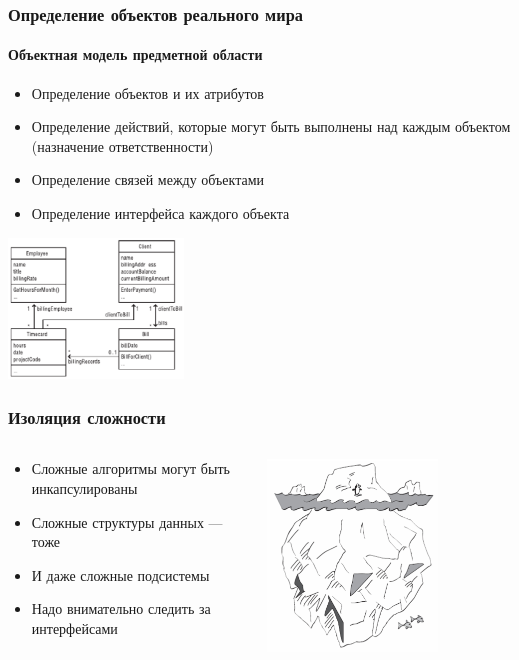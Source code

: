 \documentclass[xetex,mathserif,serif]{beamer}
\begin{document}
	\begin{frame}
		\frametitle{Определение объектов реального мира}
		\framesubtitle{Объектная модель предметной области}
		\begin{itemize}
			\item Определение объектов и их атрибутов
			\item Определение действий, которые могут быть выполнены над каждым объектом (назначение ответственности)
			\item Определение связей между объектами
			\item Определение интерфейса каждого объекта
		\end{itemize}
		\begin{center}
			\includegraphics[width=0.35\textwidth]{billDomainModel.png}
		\end{center}
	\end{frame}

	\begin{frame}
		\frametitle{Изоляция сложности}
		\begin{columns}
			\begin{column}{0.6\textwidth}
				\begin{itemize}
					\item Сложные алгоритмы могут быть инкапсулированы
					\item Сложные структуры данных --- тоже
					\item И даже сложные подсистемы
					\item Надо внимательно следить за интерфейсами
				\end{itemize}
			\end{column}
			\begin{column}{0.4\textwidth}
				\includegraphics[width=0.7\textwidth]{complexity.png}
			\end{column}
		\end{columns}
	\end{frame}
\end{document}
